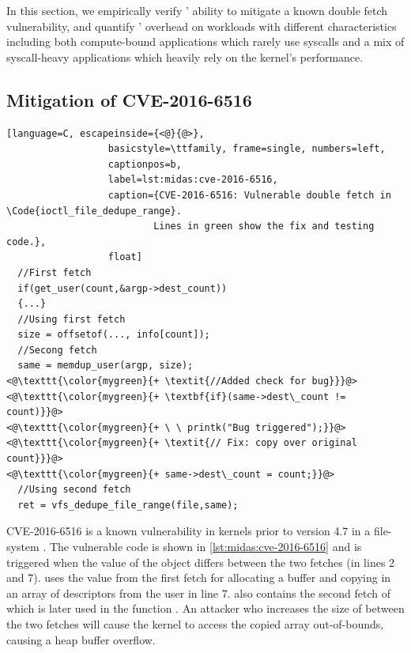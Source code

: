 In this section, we empirically verify \midas' ability to mitigate
a known double fetch vulnerability, and quantify \midas' overhead on
workloads with different characteristics including both compute-bound
applications which rarely use syscalls and a mix of syscall-heavy applications
which heavily rely on the kernel's performance.

\subsection{Mitigation of CVE-2016-6516}

\begin{lstlisting}[language=C, escapeinside={<@}{@>},
                  basicstyle=\ttfamily, frame=single, numbers=left,
                  captionpos=b,
                  label=lst:midas:cve-2016-6516,
                  caption={CVE-2016-6516: Vulnerable double fetch in \Code{ioctl_file_dedupe_range}.
                          Lines in green show the fix and testing code.},
                  float]
  //First fetch
  if(get_user(count,&argp->dest_count))
  {...}
  //Using first fetch
  size = offsetof(..., info[count]);
  //Secong fetch
  same = memdup_user(argp, size);
<@\texttt{\color{mygreen}{+ \textit{//Added check for bug}}}@>
<@\texttt{\color{mygreen}{+ \textbf{if}(same->dest\_count != count)}}@>
<@\texttt{\color{mygreen}{+ \ \ printk("Bug triggered");}}@>
<@\texttt{\color{mygreen}{+ \textit{// Fix: copy over original count}}}@>
<@\texttt{\color{mygreen}{+ same->dest\_count = count;}}@>
  //Using second fetch
  ret = vfs_dedupe_file_range(file,same);
\end{lstlisting}

CVE-2016-6516 is a known vulnerability in kernels prior to version
4.7 in a file-system .
The vulnerable code is shown in \autoref{lst:midas:cve-2016-6516} and is
triggered when the value of the  object differs between
the two fetches (in lines 2 and 7).
 uses the value from the first fetch for allocating a buffer
and copying in an array of descriptors from the user in line 7.
 also contains the second fetch of 
which is later used in the function .
An attacker who increases the size of  between the
two fetches will cause the kernel to access the copied array out-of-bounds,
causing a heap buffer overflow.

